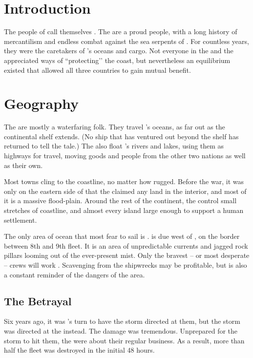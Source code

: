 \documentclass[blue]{GL2020}
\begin{document}
\name{\bVikings{}}

\section{Introduction}
The people of \pShip{} call themselves \pShippies{}. The \pShippies{} are a proud people, with a long history of mercantilism and endless combat against the sea serpents of \pEarth{}. For countless years, they were the caretakers of \pEarth{}'s oceans and cargo. Not everyone in the \pFarm{} and the \pTech{} appreciated \pShip{} ways of ``protecting’’ the coast, but nevertheless an equilibrium existed that allowed all three countries to gain mutual benefit.

\section*{Geography}
The \pShip{} are mostly a waterfaring folk. They travel \pEarth{}’s oceans, as far out as the continental shelf extends. (No ship that has ventured out beyond the shelf has returned to tell the tale.) The \pShippies{} also float \pEarth{}’s rivers and lakes, using them as highways for travel, moving goods and people from the other two nations as well as their own.

Most \pShip{} towns cling to the coastline, no matter how rugged. Before the war, it was only on the eastern side of \pEarth{} that the \pShippies{} claimed any land in the interior, and most of it is a massive flood-plain. Around the rest of the continent, the \pShip{} control small stretches of coastline, and almost every island large enough to support a human settlement. 

The only area of ocean that most \pShippies{} fear to sail is \pWod{}. \pWod{} is due west of \pEarth{}, on the border between 8th and 9th fleet. It is an area of unpredictable currents and jagged rock pillars looming out of the ever-present mist. Only the bravest -- or most desperate -- crews will work \pWod{}. Scavenging from the shipwrecks may be profitable, but is also a constant reminder of the dangers of the area.

\subsection*{The Betrayal}
Six years ago, it was \pTech{}'s turn to have the storm directed at them, but the storm was directed at the \pShip{} instead. The damage was tremendous. Unprepared for the storm to hit them, the \pShippies{} were about their regular business. As a result, more than half the fleet was destroyed in the initial 48 hours. 
\end{document}
